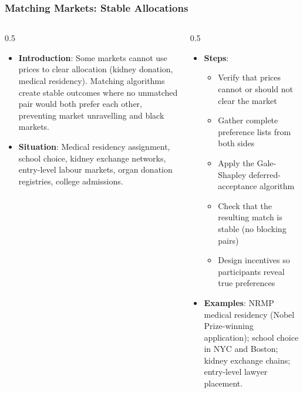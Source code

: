 \begin{frame}[fragile]\frametitle{Matching Markets: Stable Allocations}
\begin{columns}
    \begin{column}[T]{0.5\linewidth}
      \begin{itemize}
        \item \textbf{Introduction}: Some markets cannot use prices to clear allocation (kidney donation, medical residency). Matching algorithms create stable outcomes where no unmatched pair would both prefer each other, preventing market unravelling and black markets.
        \item \textbf{Situation}: Medical residency assignment, school choice, kidney exchange networks, entry-level labour markets, organ donation registries, college admissions.
      \end{itemize}
    \end{column}
    \begin{column}[T]{0.5\linewidth}
      \begin{itemize}
        \item \textbf{Steps}:
        \begin{itemize}
          \item Verify that prices cannot or should not clear the market
          \item Gather complete preference lists from both sides
          \item Apply the Gale-Shapley deferred-acceptance algorithm
          \item Check that the resulting match is stable (no blocking pairs)
          \item Design incentives so participants reveal true preferences
        \end{itemize}\item \textbf{Examples}: NRMP medical residency (Nobel Prize-winning application); school choice in NYC and Boston; kidney exchange chains; entry-level lawyer placement.
      \end{itemize}
    \end{column}
  \end{columns}
\end{frame}

